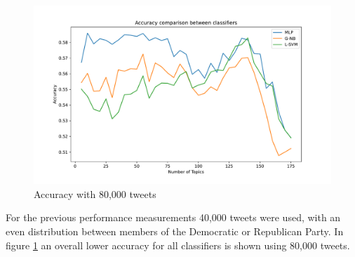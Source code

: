 \documentclass[sigconf, nonacm]{acmart}
\begin{document}
\begin{figure}[h]
	\centering
	\includegraphics[width=\linewidth, trim={2cm 0.7cm 2cm 1.7cm}, clip]{figures/80k/classifier_accuracies_over_topics.pdf}
	\caption{Accuracy with 80,000 tweets}
	\label{fig:acc_80k}
\end{figure}

For the previous performance measurements 40,000 tweets were used, with an even distribution between members of the Democratic or Republican Party. 
In figure \ref{fig:acc_80k} an overall lower accuracy for all classifiers is shown using 80,000 tweets. 
\end{document}
